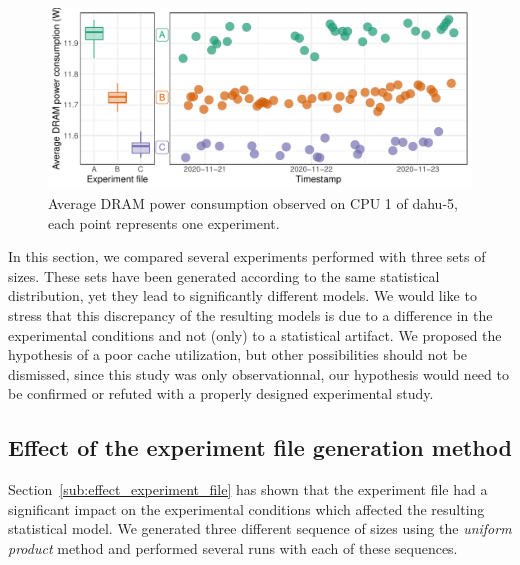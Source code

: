             \begin{figure}[htpb]
                \centering
                \includegraphics[width=\linewidth]{img/experiment/randomizing_sizes/expfile/average_power.pdf}
                \caption{Average DRAM power consumption observed on CPU 1 of dahu-5, each point represents one
                experiment.}%
                \label{fig:randomizing_sizes:expfile:average_power}
            \end{figure}

            In this section, we compared several \dgemm experiments performed with three sets of sizes. These sets have
            been generated according to the same statistical distribution, yet they lead to significantly different
            \dgemm models. We would like to stress that this discrepancy of the resulting models is due to a difference
            in the experimental conditions and not (only) to a statistical artifact. We proposed the hypothesis of a
            poor cache utilization, but other possibilities should not be dismissed, since this study was only
            observationnal, our hypothesis would need to be confirmed or refuted with a properly designed experimental
            study.

        \subsection{Effect of the experiment file generation method}%
        \label{sub:effect_experiment_file_generation_method}

            Section~\ref{sub:effect_experiment_file} has shown that the experiment file had a significant impact on the
            experimental conditions which affected the resulting statistical model. We generated three different
            sequence of sizes using the \emph{uniform product} method and performed several runs with each of these
            sequences.

